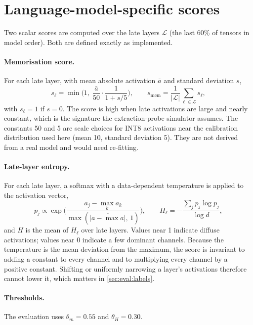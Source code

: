 \section{Language-model-specific scores}
\label{sec:design:llm}

Two scalar scores are computed over the late layers $\mathcal{L}$ (the last 60\% of
tensors in model order). Both are defined exactly as implemented.

\paragraph{Memorisation score.} For each late layer, with mean absolute activation $\bar a$ and
standard deviation $s$,
\begin{equation}
  s_\ell = \min\!\Big(1,\; \frac{\bar a}{50}\cdot\frac{1}{1+s/5}\Big),
  \qquad s_{\text{mem}} = \frac{1}{|\mathcal{L}|}\sum_{\ell\in\mathcal{L}} s_\ell ,
  \label{eq:mem}
\end{equation}
with $s_\ell=1$ if $s=0$. The score is high when late activations are large and nearly
constant, which is the signature the extraction-probe simulator assumes. The constants 50 and 5
are scale choices for INT8 activations near the calibration distribution used here (mean 10,
standard deviation 5). They are not derived from a real model and would need re-fitting.

\paragraph{Late-layer entropy.} For each late layer, a softmax with a data-dependent temperature
is applied to the activation vector,
\begin{equation}
  p_j \propto \exp\!\Big(\frac{a_j - \max_k a_k}{\max(\overline{|a - \max a|},\,1)}\Big),
  \qquad
  H_\ell = -\frac{\sum_j p_j\log p_j}{\log d},
  \label{eq:entropy}
\end{equation}
and $H$ is the mean of $H_\ell$ over late layers. Values near 1 indicate diffuse activations;
values near 0 indicate a few dominant channels. Because the temperature is the mean deviation
from the maximum, the score is invariant to adding a constant to every channel and to
multiplying every channel by a positive constant. Shifting or uniformly narrowing a layer's
activations therefore cannot lower it, which matters in \cref{sec:eval:labels}.

\paragraph{Thresholds.} The evaluation uses $\theta_m=0.55$ and $\theta_H=0.30$.


